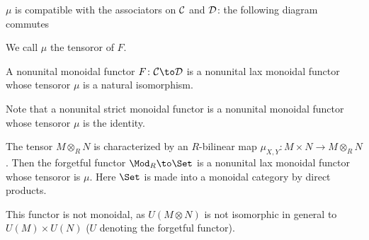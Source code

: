
        \item $\mu$ is compatible with the associators on ${{\cal C}}$ and ${{\cal D}}$: the following diagram commutes

    \eenum

    We call $\mu$ the {\emphcolor tensoror} of $F$.

\edefn

\bdefn[title={Nonunital monoidal functors}]

    A {\emphcolor nonunital monoidal functor} $F\colon\C\to\D$ is a nonunital lax monoidal functor whose tensoror $\mu$ is a natural isomorphism.

\edefn

Note that a nonunital strict monoidal functor is a nonunital monoidal functor whose tensoror $\mu$ is the identity.

\bexam

    The tensor $M\otimes_RN$ is characterized by an $R$-bilinear map $\mu_{X,Y}\colon M\times N\to M\otimes_RN$.
    Then the forgetful functor $\Mod_R\to\Set$ is a nonunital lax monoidal functor whose tensoror is $\mu$.
    Here $\Set$ is made into a monoidal category by direct products.

    This functor is not monoidal, as $U(M\otimes N)$ is not isomorphic in general to $U(M)\times U(N)$ ($U$ denoting the forgetful functor).

